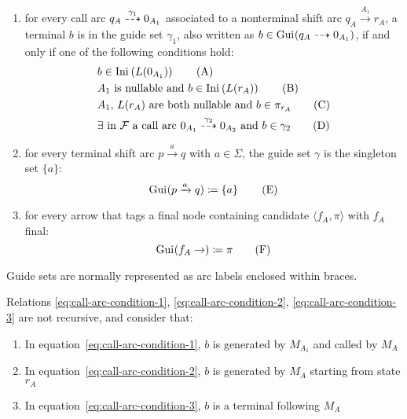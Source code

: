 \documentclass[english]{article}
\begin{document}
\begin{enumerate}
  \item for every call arc \(q_A \stackrel{\gamma_1}{\dashrightarrow} 0_{A_1}\) associated to a nonterminal shift arc \(q_A \xrightarrow{A_1} r_A\), a terminal \(b\) is in the guide set \(\gamma_1\), also written as \(b \in \text{Gui}\hspace{0.1ex}(q_A \dashrightarrow 0_{A_1})\), if and only if one of the following conditions hold:
        \begin{align}
           & b \in \Ini\left( L(0_{A_1}) \right) \label{eq:call-arc-condition-1}\tag{A}                                                                                              \\
           & A_1 \ \text{is nullable and} \ b \in \Ini\left( L(r_A) \right) \label{eq:call-arc-condition-2}\tag{B}                                                                   \\
           & A_1, \, L(r_A) \ \text{are both nullable and} \ b \in \pi_{r_A} \label{eq:call-arc-condition-3}\tag{C}                                                                  \\
           & \exists \ \text{in} \ \mathcal{F} \ \text{a call arc} \ 0_{A_1} \xdashrightarrow{\gamma_2} 0_{A_2} \ \text{and} \ b \in \gamma_2 \label{eq:call-arc-condition-4}\tag{D}
        \end{align}
  \item for every terminal shift arc \(p \xrightarrow{a} q\) with \(a \in \Sigma\), the guide set \(\gamma\) is the singleton set \(\{a\}\):
        \[ \text{Gui}\hspace{0.1ex}(p \xrightarrow{a} q) \coloneqq \left\{ a \right\}\tag{E} \]
  \item for every arrow that tags a final node containing candidate \(\langle f_A, \pi \rangle\) with \(f_A\) final:
        \[ \text{Gui}\hspace{0.1ex}(f_A \rightarrow ) \coloneqq \pi \tag{F} \]
\end{enumerate}

Guide sets are normally represented as arc labels enclosed within braces.

Relations \ref{eq:call-arc-condition-1}, \ref{eq:call-arc-condition-2}, \ref{eq:call-arc-condition-3} are not recursive, and consider that:

\begin{enumerate}
  \item In equation~\ref{eq:call-arc-condition-1}, \(b\) is generated by \(M_{A_1}\) and called by \(M_A\)
  \item In equation~\ref{eq:call-arc-condition-2}, \(b\) is generated by \(M_A\) starting from state \(r_A\)
  \item In equation~\ref{eq:call-arc-condition-3}, \(b\) is a terminal following \(M_A\)
\end{enumerate}
\end{document}
